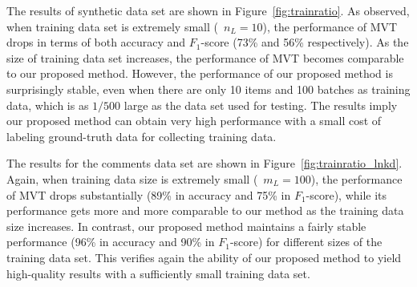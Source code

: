 The results of synthetic data set are shown in Figure~\ref{fig:trainratio}.  
As observed, when training data set is extremely small (\eg~$n_L=10$), 
the performance of MVT drops in terms of both accuracy and $F_1$-score (73\% and 56\% respectively).  
As the size of training data set increases, 
the performance of MVT becomes comparable to our proposed method.  
However, the performance of our proposed method is surprisingly stable, 
even when there are only 10 items and 100 batches as training data, 
which is as $1/500$ large as the data set used for testing.  
The results imply our proposed method can obtain very high performance 
with a small cost of labeling ground-truth data for collecting training data.  

The results for the comments data set are shown in Figure~\ref{fig:trainratio_lnkd}.  
Again, when training data size is extremely small (\eg~$m_L=100$), 
the performance of MVT drops substantially (89\% in accuracy and 75\% in $F_1$-score), 
while its performance gets more and more comparable to our method as the training data size increases.  
In contrast, our proposed method maintains a fairly stable 
performance (96\% in accuracy and 90\% in $F_1$-score) for different sizes of the training data set. 
This verifies again the ability of our proposed method to yield high-quality results 
with a sufficiently small training data set.  


%
